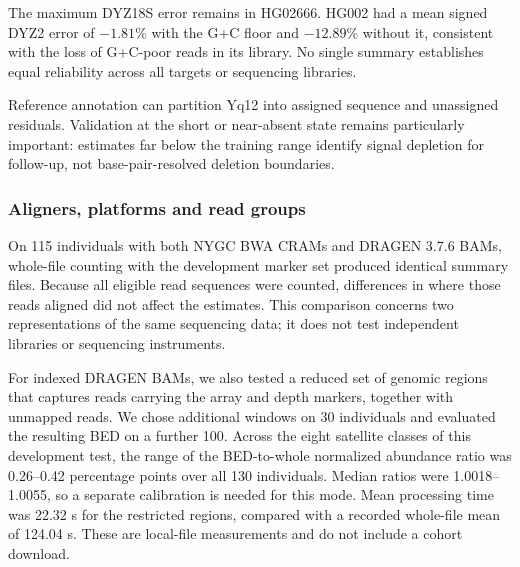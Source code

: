  The maximum DYZ18S error remains  in HG02666.  HG002 had a mean signed DYZ2 error of $-1.81\%$ with the G+C floor and $-12.89\%$ without it, consistent with the loss of G+C-poor reads in its library. No single summary establishes equal reliability across all targets or sequencing libraries.

Reference annotation can partition Yq12 into assigned sequence and unassigned residuals.  Validation at the short or near-absent state remains particularly important: estimates far below the training range identify signal depletion for follow-up, not base-pair-resolved deletion boundaries.

\subsubsection{Aligners, platforms and read groups}\label{sec:res-groups}
On 115 individuals with both NYGC BWA CRAMs and DRAGEN 3.7.6 BAMs, whole-file counting with the development marker set produced identical summary files. Because all eligible read sequences were counted, differences in where those reads aligned did not affect the estimates.  This comparison concerns two representations of the same sequencing data; it does not test independent libraries or sequencing instruments.

For indexed DRAGEN BAMs, we also tested a reduced set of genomic regions that captures reads carrying the array and depth markers, together with unmapped reads. We chose additional windows on 30 individuals and evaluated the resulting BED on a further 100. Across the eight satellite classes of this development test, the range of the BED-to-whole normalized abundance ratio was 0.26--0.42 percentage points over all 130 individuals. Median ratios were 1.0018--1.0055, so a separate calibration is needed for this mode.  Mean processing time was 22.32 s for the restricted regions, compared with a recorded whole-file mean of 124.04 s. These are local-file measurements and do not include a cohort download.

